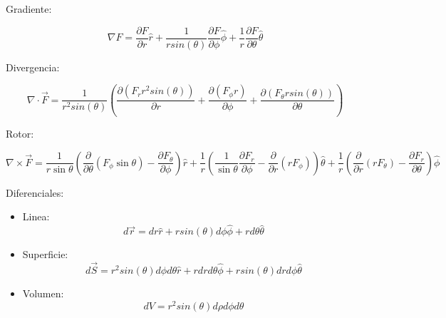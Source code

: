 \medbreak

Gradiente:

\[\nabla F = \frac{\partial F}{\partial r}\hat{r} + \frac{1}{rsin(\theta)}\frac{\partial F}{\partial \phi}\hat{\phi} + \frac{1}{r}\frac{\partial F}{\partial \theta}\hat{\theta}\]

Divergencia:

\[\nabla \cdot \vec{F} = \frac{1}{r^2sin(\theta)}\left(\frac{\partial(F_{r}r^2sin(\theta))}{\partial r}+\frac{\partial (F_{\phi}r)}{\partial\phi}+\frac{\partial(F_{\theta}rsin(\theta))}{\partial \theta}\right)\]

Rotor:

\[\nabla\times\vec{F} = \frac{1}{r\sin\theta} \left( \frac{\partial}{\partial \theta} \left(F_\phi\sin\theta \right) - \frac{\partial F_\theta}{\partial \phi} \right) \hat{r} + \frac{1}{r} \left( \frac{1}{\sin\theta} \frac{\partial F_r}{\partial \phi} - \frac{\partial}{\partial r} \left( r F_\phi \right) \right) \hat{\theta} + \frac{1}{r} \left( \frac{\partial}{\partial r} \left( r F_{\theta} \right) - \frac{\partial F_r}{\partial \theta} \right) \hat{\phi}\]

Diferenciales:

\begin{itemize}
    \item Linea:
    \[d\vec{r} = dr\hat{r} + rsin(\theta) d\phi\hat{\phi}+rd\theta\hat{\theta}\]
    \item Superficie:
    \[d\vec{S} = r^2sin(\theta)d\phi d\theta\hat{r}+rdrd\theta\hat{\phi}+rsin(\theta)dr d\phi\hat{\theta}\]
    \item Volumen:
    \[dV = r^2sin(\theta)d\rho d\phi d\theta\]
\end{itemize}

\newpage